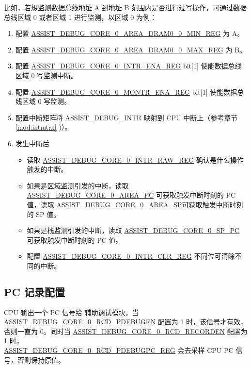 \documentclass[main\_\_CN.tex]{subfiles}
\begin{document}
 
 比如，若想监测数据总线地址 A 到地址 B 范围内是否进行过写操作，可通过数据总线区域 0 或者区域 1 进行监测，以区域 0 为例：
\begin{enumerate}
    \item 配置 \hyperref[regdesc:ASSISTDEBUGCORE0AREADRAM00MINREG]{ASSIST\_DEBUG\_CORE\_0\_AREA\_DRAM0\_0\_MIN\_REG} 为 A。
    \item 配置 \hyperref[regdesc:ASSISTDEBUGCORE0AREADRAM00MAXREG]{ASSIST\_DEBUG\_CORE\_0\_AREA\_DRAM0\_0\_MAX\_REG} 为 B。
    \item 配置 \hyperref[regdesc:ASSISTDEBUGCORE0INTRENAREG]{ASSIST\_DEBUG\_CORE\_0\_INTR\_ENA\_REG} bit[1] 使能数据总线区域 0 写监测中断。
    \item 配置 \hyperref[regdesc:ASSISTDEBUGCORE0MONTRENAREG]{ASSIST\_DEBUG\_CORE\_0\_MONTR\_ENA\_REG} bit[1] 使能数据总线区域 0 写监测。
    \item 配置中断矩阵将 ASSIST\_DEBUG\_INTR 映射到 CPU 中断上（参考章节 \ref{mod:intmtrx} \textit{})）。
    \item 发生中断后
    \begin{itemize}
        \item 读取 \hyperref[regdesc:ASSISTDEBUGCORE0INTRRAWREG]{ASSIST\_DEBUG\_CORE\_0\_INTR\_RAW\_REG} 确认是什么操作触发的中断。
        \item 如果是区域监测引发的中断，读取 \hyperref[fielddesc:ASSISTDEBUGCORE0AREAPC]{ASSIST\_DEBUG\_CORE\_0\_AREA\_PC} 可获取触发中断时刻的 PC 值，读取 \hyperref[fielddesc:ASSISTDEBUGCORE0AREASP]{ASSIST\_DEBUG\_CORE\_0\_AREA\_SP}可获取触发中断时刻的 SP 值。
        \item 如果是栈监测引发的中断，读取 \hyperref[fielddesc:ASSISTDEBUGCORE0SPPC]{ASSIST\_DEBUG\_CORE\_0\_SP\_PC} 可获取触发中断时刻的 PC 值。
        \item 配置 \hyperref[regdesc:ASSISTDEBUGCORE0INTRCLRREG]{ASSIST\_DEBUG\_CORE\_0\_INTR\_CLR\_REG} 不同位可清除不同的中断。
    \end{itemize}

\end{enumerate}


\subsection{PC 记录配置}

CPU 输出一个 PC 信号给 辅助调试模块，当 \hyperref[fielddesc:ASSISTDEBUGCORE0RCDPDEBUGEN]{ASSIST\_DEBUG\_CORE\_0\_RCD\_PDEBUGEN} 配置为 1 时，该信号才有效，否则一直为 0。同时当 \hyperref[fielddesc:ASSISTDEBUGCORE0RCDRECORDEN]{ASSIST\_DEBUG\_CORE\_0\_RCD\_RECORDEN} 配置为 1 时，\\\hyperref[regdesc:ASSISTDEBUGCORE0RCDPDEBUGPCREG]{ASSIST\_DEBUG\_CORE\_0\_RCD\_PDEBUGPC\_REG} 会去采样 CPU PC 信号，否则保持原值。
\end{document}
